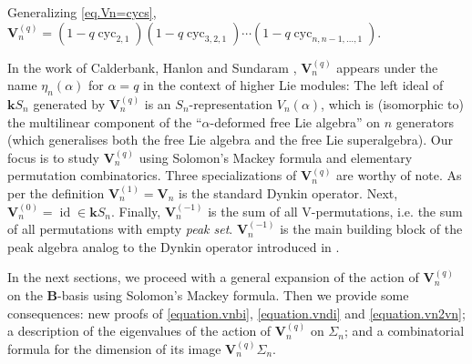 \documentclass[revision]{FPSAC2025}
\newcommand{\id}{\operatorname{id}} %
\newcommand{\kk}{\mathbf{k}} %
\newcommand{\VV}{\mathbf{V}} %
\newcommand{\VVq}{\mathbf{V}^{(q)}} %
\newenvironment{verlong}{}{}
\begin{document}
Generalizing \eqref{eq.Vn=cycs}, $\mathbf{V}_{n}^{(q)} =\left(  1-q\operatorname*{cyc}\nolimits_{2,1}\right)  \left(1-q\operatorname*{cyc}\nolimits_{3,2,1}\right)  \cdots\left(  1-q\operatorname*{cyc}\nolimits_{n,n-1,\ldots,1}\right).$

In the work of Calderbank, Hanlon and Sundaram \cite{CalderbankHanlonSundaram94}, $\VV_n^{(q)}$ appears  under the name $\eta_n(\alpha)$ for $\alpha = q$ in the context of higher Lie modules: The left ideal of $\kk S_n$ generated by $\VVq_n$ is an $S_n$-representation $V_n(\alpha)$, which is (isomorphic to) the multilinear component of the ``$\alpha$-deformed free Lie algebra'' on $n$ generators (which generalises both the free Lie algebra and the free Lie superalgebra). Our focus is to study $\VVq_n$ using Solomon's Mackey formula and elementary permutation combinatorics. 
\noindent Three specializations of $\VV^{(q)}_n$ are worthy of note. As per the definition $\VV^{(1)}_n = \VV_n$ is the standard Dynkin operator.
Next, $\VV^{(0)}_n = \id \in \kk S_n$. Finally, $\VV^{(-1)}_n$ is the sum of all V-permutations, i.e. the sum of all permutations with empty \emph{peak set}. $\VV^{(-1)}_n$ is the main building block of the peak algebra analog to the Dynkin operator introduced in \cite{Sch05}.

In the next sections, we proceed with a general expansion of the action of $\mathbf{V}_{n}^{(q)}$ on the $\mathbf{B}$-basis using Solomon's Mackey formula.
Then we provide some consequences:
new proofs of \eqref{equation.vnbi}, \eqref{equation.vndi} and \eqref{equation.vn2vn};
a description of the eigenvalues of the action of $\VVq_n$ on $\Sigma_n$;
and a combinatorial formula for the dimension of its image $\VVq_n \Sigma_n$.
\end{document}
